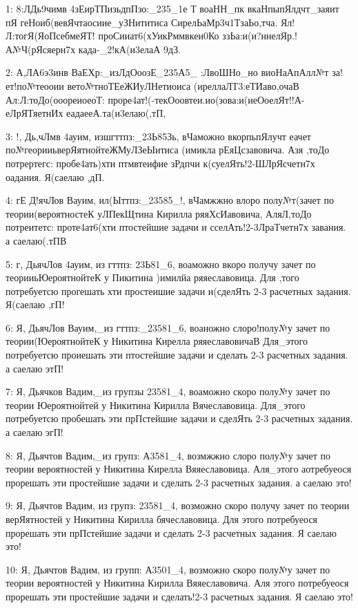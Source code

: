 { \scriptsize
1: 8:ЛДь9чимв 4зЕирТПизьдпПзо:\_235\_1е Т воаНН\_пк вкаНпыпЯлдчт\_заяит пЯ геНоиб(вевЯчтаосиие\_уЗНититиса СирелЬаМр3ч1ТзаЬо,тча. Ял!Л:тогЯ(ЯоПсебмеЯТ! проСииат6(хУикРммвкеи0Ко ззЬа:и(и?ннелЯр.!А№Ч(рЯсяерн7х када-\_2!кА(и3елаА 9дЗ.

2: А,ЛА6э3инв ВаЕХр:\_изЛдОоозЕ\_235А5\_ :ЛвоШНо\_но виоНаАпАлл№т за!ет!по№теооии вето№тноТЕеЖИуЛНетиоиса (иреллаЛТ3:еТИаво,очаВ Ал:Л:тоДо(ооореиоеоТ: проре4ат!(-текОоовтеи.ио(зова:и(иеОоелЯт!!А-еЛрЯТяетнИх еадаееА.та(и3елаю(,тП,

3: !, Дь,чЛмв 4ауим, изшгттпз:\_23Ь85Зь, вЧаможно вкорпьпЯлучт еачет по№георииьверЯятнойтеЖМуЛЗеЫитиса (имикла рЕяЦсзавовича. Азя ,тоДо потрертегс: пробе4ать)хти птмвтеифие зРдпчи к(суелЯть!2-ШЛрЯсчетн7х оадания. Я(саелаю ,дП.

4: гЕ Д!ячЛов Вауим, ил(Ыттпз:\_23585\_!, вЧамжжно влоро полу№т(зачет по теории(вероятностеК уЛПекЩтина Кирилла ряяХсИавовича, АляЛ,тоДо потреитетс: проте4ат6(хти птостейшие задачи и сселАть!2-3ЛраТчетн7х завания. а саелаю(.тПВ

5: г, ДьячЛов 4ауим, из гттпз: 23Ь81\_6, воаможно вкоро получу зачет по теорииьЮероятнойтеК у Пикитина )имилйа ряяеславовица. Для ,того потребуетсю прогешать хти простеишие задачи и(сделЯть 2-3 расчетных задания. Я(саелаю ,гП!

6: Я, ДьячЛов Вауим,\_из гттпз:\_23581\_6, воаножно слоро!полу№у зачет по теории(ЮероятнойтеК у Никитина Кирелла ряяеславовичаВ Для\_этого потребуетсю проиешать эти птостейшие задачи и сделать 2-3 расчетных задания. а саелаю этП!

7: Я, Дьячков Вадим,\_из групзы 23581\_4, воаможно скоро полу№у зачет по теории Юероятнойтей у Никитина Кирилла Вячеславовица. Для\_этого потребуетсю пробешать эти прПстейшие задачи и сделЯть 2-3 расчетных задания. а саелаю эгП!

8: Я, Дьячтов Вадим,\_из групз: А3581\_4, возмжжно слоро полу№у зачет по теории вероятностей у Никитина Кирелла Вяяеславовица. Аля\_этого аотребуеося прорешать эти простейшие задачи и сделать 2-3 расчетных задания. а саелаю это!

9: Я, Дьячтов Вадим, из групз: 23581\_4, возможно скоро получу зачет по теории верЯятностей у Никитина Кирилла бячеславовица. Для этого потребуеося прорешать эти прПстейшие задачи и сделать 2-3 расчетных задания. Я саелаю это!

10: Я, Дьячтов Вадим, из групп: А3501\_4, возможно скоро полу№у зачет по теории вероятностей у Никитина Кирилла Вяяеславовича. Аля этого потребуеося прорешать эти простейшие задачи и сделать!2-3 расчетных задания. Я саелаю это!

}
